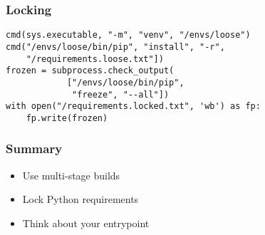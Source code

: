 \documentclass{beamer}
\begin{document}
\begin{frame}[fragile]
\frametitle{Locking}
\begin{lstlisting}
cmd(sys.executable, "-m", "venv", "/envs/loose")
cmd("/envs/loose/bin/pip", "install", "-r",
    "/requirements.loose.txt"])
frozen = subprocess.check_output(
            ["/envs/loose/bin/pip",
             "freeze", "--all"])
with open("/requirements.locked.txt", 'wb') as fp:
    fp.write(frozen)
\end{lstlisting}
\end{frame}

\begin{frame}
\frametitle{Summary}
\begin{itemize}
\item Use multi-stage builds \pause
\item Lock Python requirements \pause
\item Think about your entrypoint
\end{itemize}
\end{frame}
\end{document}
